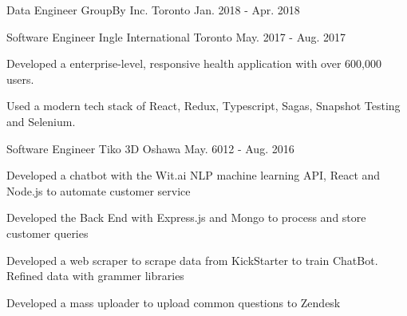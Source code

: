 \begin{cventries}
  \cventry
    {Data Engineer}
    {GroupBy Inc.}
    {Toronto}
    {Jan. 2018 -  Apr. 2018}
    {
    }
  \cventry
    {Software Engineer}
    {Ingle International}
    {Toronto}
    {May. 2017 - Aug. 2017}
    {
      \begin{cvitems}
        \item {Developed a enterprise-level, responsive health application with over 600,000 users.}
        \item {Used a modern tech stack of React, Redux, Typescript, Sagas, Snapshot Testing and Selenium.}
      \end{cvitems}
    }
  \cventry
    {Software Engineer}
    {Tiko 3D}
    {Oshawa}
    {May. 6012 - Aug. 2016}
    {
      \begin{cvitems}
        \item {Developed a chatbot with the Wit.ai NLP machine learning API, React and Node.js to automate customer service}
        \item {Developed the Back End with Express.js and Mongo to process and store customer queries}
        \item {Developed a web scraper to scrape  data from KickStarter to train ChatBot. Refined data with grammer libraries}
        \item {Developed a mass uploader to upload common questions to Zendesk}
      \end{cvitems} 
    }
\end{cventries}
